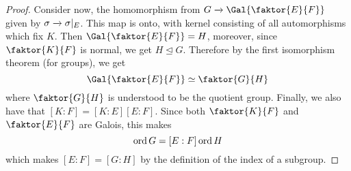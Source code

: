 \begin{proof}
    Consider now, the homomorphism from $G \xrightarrow{} \Gal{\faktor{E}{F}}$
    given by $\sigma \xrightarrow{} \sigma|_E$. This map is onto, with kernel consisting
    of all automorphisms which fix $K$. Then  $\Gal{\faktor{E}{F}}=H$, moreover,
    since $\faktor{K}{F}$ is normal, we get $H \unlhd G$. Therefore by the first
    isomorphism theorem (for groups), we get
    \begin{equation*}
        \Gal{\faktor{E}{F}} \simeq \faktor{G}{H}
    \end{equation*}
    where $\faktor{G}{H}$ is understood to be the quotient group. Finally, we
    also have that $[K:F]=[K:E][E:F]$. Since both $\faktor{K}{F}$ and
    $\faktor{E}{F}$ are Galois, this makes
    \begin{equation*}
        \operatorname{ord}{G}=[E:F]\operatorname{ord}{H}
    \end{equation*}
    which makes $[E:F]=[G:H]$ by the definition of the index of a subgroup.
\end{proof}

